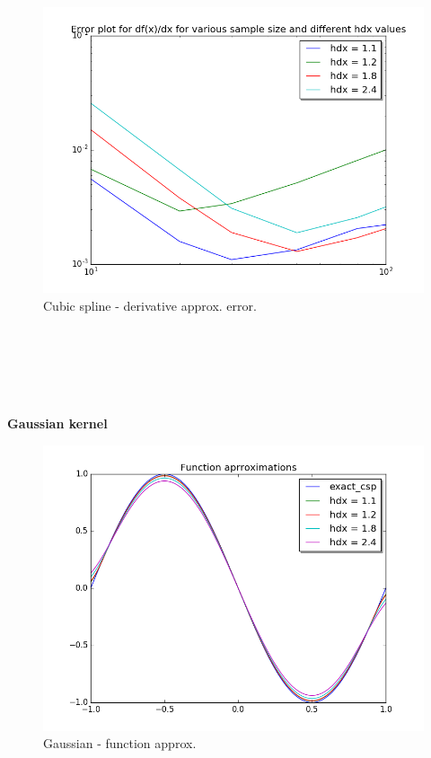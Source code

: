 \documentclass[a4paper,11pt]{article}
\begin{document}
\begin{figure}[ht]
    \centering
    \includegraphics[width=.8\linewidth]{derv_err_csp.png}
    \caption{Cubic spline - derivative approx. error.}
    \label{fig:ex5}    
\end{figure}


\newpage
\indent\\
\newpage
\indent\\
\newpage
\indent\\
\newpage
\indent\\
\newpage
\indent\\


\indent \textbf{Gaussian kernel}
\begin{figure}[ht]
    \centering
    \includegraphics[width=.8\linewidth]{fun_gau.png}
    \caption{Gaussian - function approx.}
    \label{fig:ex6}    
\end{figure}
\end{document}
